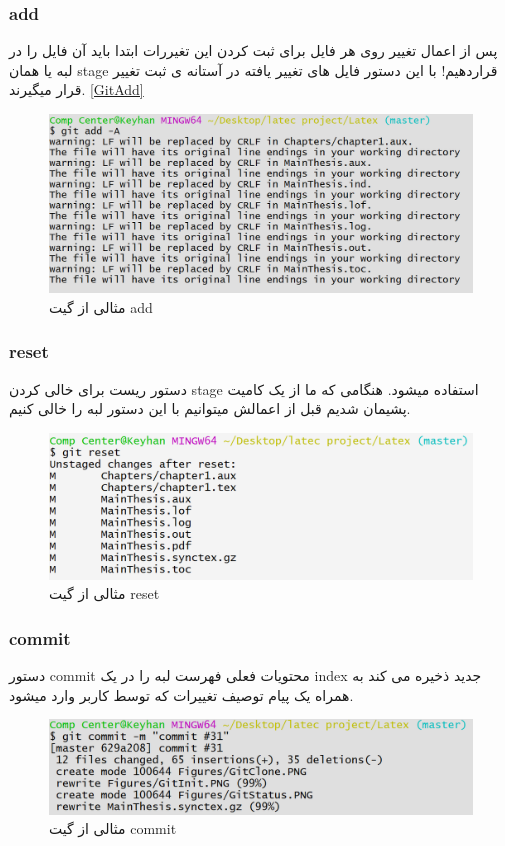 \subsubsection{add}
پس از اعمال تغییر روی هر فایل برای ثبت کردن این تغیررات ابتدا باید آن فایل را در لبه یا همان stage قراردهیم! با این دستور فایل های تغییر یافته در آستانه ی ثبت تغییر قرار میگیرند. \ref{GitAdd}
\begin{figure}[tbh]
	\centering
	\includegraphics[width=1\textwidth]{./Figures/GitAdd}
	\caption{  مثالی از گیت add   }
	\label{Fig:GitAdd}
\end{figure}
\subsubsection{reset}
دستور ریست برای خالی کردن stage استفاده میشود. هنگامی که ما از یک کامیت پشیمان شدیم قبل از اعمالش میتوانیم با این دستور لبه را خالی کنیم.
\begin{figure}[tbh]
	\centering
	\includegraphics[width=1\textwidth]{./Figures/GitReset}
	\caption{ مثالی از گیت reset }
	\label{Fig:GitReset}
\end{figure}
\subsubsection{commit}
دستور commit محتویات فعلی فهرست لبه را در یک index جدید ذخیره می کند به همراه یک پیام   توصیف تغییرات که توسط کاربر وارد میشود.
\begin{figure}[tbh]
	\centering
	\includegraphics[width=1\textwidth]{./Figures/GitCommit}
	\caption{ مثالی از گیت commit }
	\label{Fig:GitCommit}
\end{figure}
